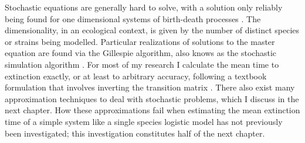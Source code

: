 

Stochastic equations are generally hard to solve, with a solution only reliably being found for one dimensional systems of birth-death processes \cite{Nisbet1982,Gardiner2004,Hanggi1990}. %
The dimensionality, in an ecological context, is given by the number of distinct species or strains being modelled. 
Particular realizations of solutions to the master equation are found via the Gillespie algorithm, also knows as the stochastic simulation algorithm \cite{Gillespie1977,Cao2006}. 
For most of my research I calculate the mean time to extinction exactly, or at least to arbitrary accuracy, following a textbook formulation that involves inverting the transition matrix \cite{Nisbet1982,Norden1982,Parsons2007,Parsons2010}. 
There also exist many approximation techniques to deal with stochastic problems, which I discuss in the next chapter. 
How these approximations fail when estimating the mean extinction time of a simple system like a single species logistic model has not previously been investigated; this investigation constitutes half of the next chapter. 




